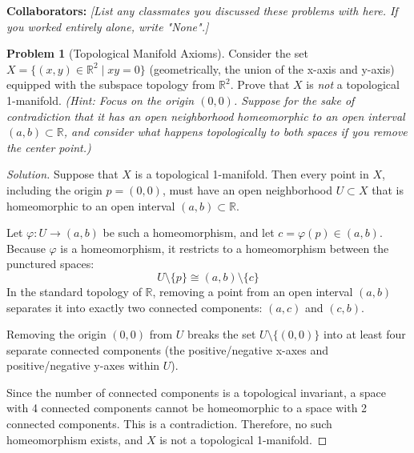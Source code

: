\documentclass[12pt, a4paper]{article}
\theoremstyle{definition}
\newtheorem{problem}{Problem}
\newenvironment{solution}
  {\renewcommand\qedsymbol{$\blacksquare$}\begin{proof}[Solution]}
  {\end{proof}}
\newcommand{\RR}{\mathbb{R}}
\begin{document}
\noindent \textbf{Collaborators:} \textit{[List any classmates you discussed these problems with here. If you worked entirely alone, write "None".]}
\vspace{0.8cm}


\begin{problem}[Topological Manifold Axioms]
Consider the set $X = \{(x,y) \in \RR^2 \mid xy = 0\}$ (geometrically, the union of the x-axis and y-axis) equipped with the subspace topology from $\RR^2$. Prove that $X$ is \emph{not} a topological 1-manifold. 
\textit{(Hint: Focus on the origin $(0,0)$. Suppose for the sake of contradiction that it has an open neighborhood homeomorphic to an open interval $(a,b) \subset \RR$, and consider what happens topologically to both spaces if you remove the center point.)}
\end{problem}
\begin{solution}
Suppose that $X$ is a topological 1-manifold. Then every point in $X$, including the origin $p = (0,0)$, must have an open neighborhood $U \subset X$ that is homeomorphic to an open interval $(a,b) \subset \RR$. 

Let $\varphi: U \to (a,b)$ be such a homeomorphism, and let $c = \varphi(p) \in (a,b)$. Because $\varphi$ is a homeomorphism, it restricts to a homeomorphism between the punctured spaces:
\[
U \setminus \{p\} \cong (a,b) \setminus \{c\}
\]
In the standard topology of $\RR$, removing a point from an open interval $(a,b)$ separates it into exactly two connected components: $(a,c)$ and $(c,b)$. 

Removing the origin $(0,0)$ from $U$ breaks the set $U \setminus \{(0,0)\}$ into at least four separate connected components (the positive/negative x-axes and positive/negative y-axes within $U$). 

Since the number of connected components is a topological invariant, a space with 4 connected components cannot be homeomorphic to a space with 2 connected components. This is a contradiction. Therefore, no such homeomorphism exists, and $X$ is not a topological 1-manifold.\end{solution}

\vfill\newpage
\end{document}
